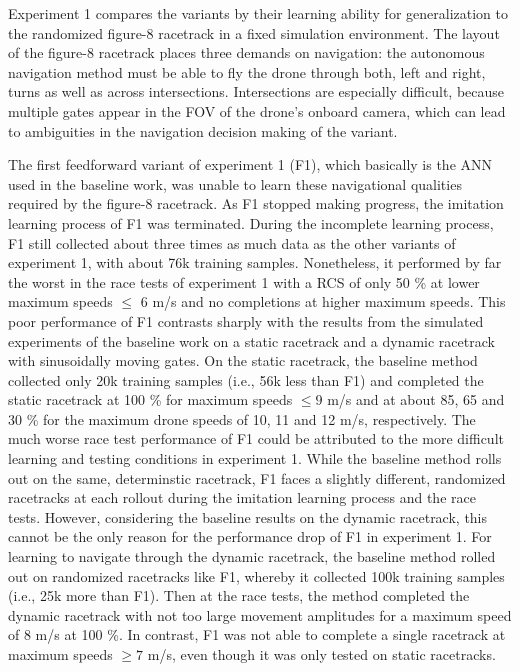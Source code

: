 Experiment 1 compares the variants by their learning ability
for generalization to the randomized figure-8 racetrack in a fixed simulation environment.
The layout of the figure-8 racetrack places three demands on navigation:
the autonomous navigation method must be able to 
fly the drone through both, left and right, turns as well as across intersections.
Intersections are especially difficult,
because multiple gates appear in the FOV of the drone's onboard camera, 
which can lead to ambiguities in the navigation decision making of the variant.

The first feedforward variant of experiment 1 (F1),
which basically is the ANN used in the baseline work,
was unable to learn these navigational qualities required by the figure-8 racetrack.
As F1 stopped making progress, the imitation learning process of F1 was terminated.
During the incomplete learning process, F1 still collected
about three times as much data as the other variants of experiment 1,
with about 76k training samples.
Nonetheless, it performed by far the worst in the race tests of experiment 1
with a RCS of only 50 \% at lower maximum speeds $\le$ 6 m/s
and no completions at higher maximum speeds.
This poor performance of F1 contrasts sharply with the results 
from the simulated experiments of the baseline work
on a static racetrack and a dynamic racetrack with sinusoidally moving gates.
On the static racetrack,
the baseline method collected only 20k training samples (i.e., 56k less than F1)
and completed the static racetrack at 100 \%
for maximum speeds $\le 9$ m/s 
and at about 85, 65 and 30 \%
for the maximum drone speeds of 10, 11 and 12 m/s, respectively.
The much worse race test performance of F1
could be attributed to the more difficult learning and testing conditions in experiment 1.
While the baseline method rolls out on the same, determinstic racetrack,
F1 faces a slightly different, randomized racetracks at each rollout during 
the imitation learning process and the race tests.
However, considering the baseline results on the dynamic racetrack, 
this cannot be the only reason for the performance drop of F1 in experiment 1.
For learning to navigate through the dynamic racetrack, 
the baseline method rolled out on randomized racetracks like F1,
whereby it collected 100k training samples (i.e., 25k more than F1).
Then at the race tests,
the method completed the dynamic racetrack
with not too large movement amplitudes
for a maximum speed of 8 m/s at 100 \%.
In contrast, F1 was not able to complete a single racetrack
at maximum speeds $\ge 7$ m/s,
even though it was only tested on static racetracks.
